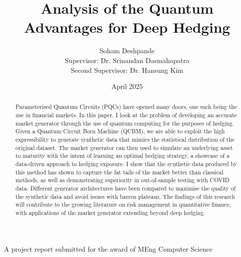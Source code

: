 \documentclass[12pt]{article}
\title{Analysis of the Quantum Advantages for Deep Hedging}
\author{Soham Deshpande\\Supervisor: Dr. Srinandan Dasmahapatra
\\Second Supervisor: Dr. Hansung Kim}
\date{April 2025}
\newcommand{\detailtexcount}[1]{%
  \immediate\write18{texcount -merge #1.tex > #1.wcdetail }%
}
\numberwithin{equation}{section}
\begin{document}
\maketitle
\vspace{10cm}
\begin{centering}
A project report submitted for the award of MEng Computer Science
\end{centering}
\thispagestyle{empty}







\clearpage


\begin{abstract}
Parameterised Quantum Circuits (PQCs) have opened many doors, one 
such being the use in financial markets. In this paper, I look at the problem 
of developing an accurate market generator through the use of quantum computing
for the purposes of hedging. 
Given a Quantum Circuit Born Machine (QCBM), we are able to exploit the high 
expressibility to generate synthetic 
data that mimics the statistical distribution of the original dataset. The market 
generator can then used to simulate an 
underlying asset to maturity with the intent of learning an optimal hedging strategy, 
a showcase of a data-driven approach to hedging exposure. I show that 
the synthetic 
data produced by this method has shown to capture the fat tails of the market 
better than classical methods, as well as demonstrating superiority in 
out-of-sample testing with COVID data. Different generator 
architectures have been compared to maximise the quality of the synthetic data 
and avoid issues with barren plateaus. 
The findings of 
this research will contribute to the growing literature on risk management in 
quantitative finance, with applications of the market generator extending beyond 
deep hedging.
\end{abstract}

\clearpage


\tableofcontents
\clearpage



\end{document}
